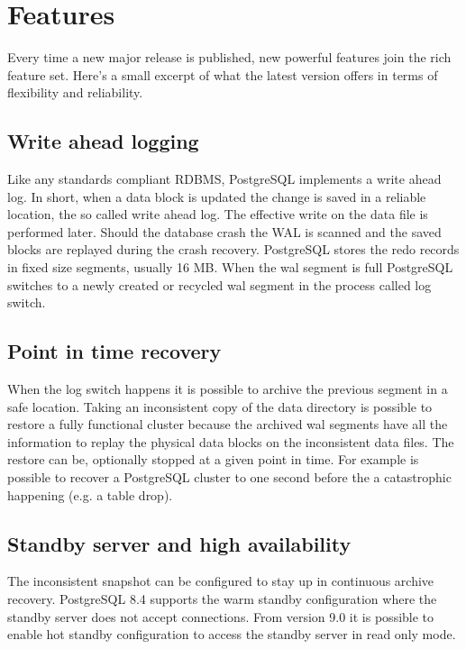 \section{Features}
Every time a new major release is published, new powerful features join the
rich feature set.
Here's a small excerpt of what the latest version offers in terms of flexibility
and reliability.

\subsection{Write ahead logging}
Like any standards compliant RDBMS, PostgreSQL implements a write ahead log.
In short, when a data block is updated the change is saved in a reliable
location, the so called write ahead log. The
effective write on the data file is performed later. Should the database crash
the WAL is scanned and the saved blocks are replayed during the
crash recovery. PostgreSQL stores the redo records in fixed size segments,
usually 16 MB. When the wal segment is full PostgreSQL switches to a newly
created or recycled wal segment in the process called log switch. 

\subsection{Point in time recovery}
When the
log switch happens it is possible to archive the previous segment in a safe
location. Taking an inconsistent copy of the data directory is possible to
restore a fully functional cluster because the archived wal segments have all
the information to replay the physical data blocks on the inconsistent data
files. The restore can be, optionally stopped at a given point in time. For
example is possible to recover a PostgreSQL cluster to one second before the
a catastrophic happening (e.g. a table drop).

\subsection{Standby server and high availability}
The inconsistent snapshot
can be configured to stay up in continuous archive recovery. PostgreSQL 8.4
supports the warm standby configuration where the standby
server does not accept connections. From version 9.0 it is possible to enable
hot standby configuration to access the standby server in
read only mode.

